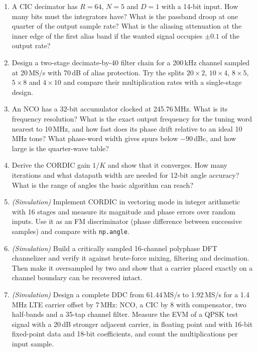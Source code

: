 \begin{enumerate}[label=\thechapter.\arabic*]
resampler by $3/2$ with a 24-tap prototype.
\item A CIC decimator has $R=64$, $N=5$ and $D=1$ with a 14-bit input. How many bits must the
integrators have? What is the passband droop at one quarter of the output sample rate? What is the
aliasing attenuation at the inner edge of the first alias band if the wanted signal occupies $\pm0.1$
of the output rate?
\item Design a two-stage decimate-by-40 filter chain for a 200\,kHz channel sampled at 20\,MS/s with
70\,dB of alias protection. Try the splits $20\times2$, $10\times4$, $8\times5$, $5\times8$ and
$4\times10$ and compare their multiplication rates with a single-stage design.
\item An NCO has a 32-bit accumulator clocked at 245.76\,MHz. What is its frequency resolution? What is
the exact output frequency for the tuning word nearest to 10\,MHz, and how fast does its phase drift
relative to an ideal 10\,MHz tone? What phase-word width gives spurs below $-90$\,dBc, and how large
is the quarter-wave table?
\item Derive the CORDIC gain $1/K$ and show that it converges. How many iterations and what datapath
width are needed for 12-bit angle accuracy? What is the range of angles the basic algorithm can
reach?
\item \emph{(Simulation)} Implement CORDIC in vectoring mode in integer arithmetic with 16 stages and
measure its magnitude and phase errors over random inputs. Use it as an FM discriminator (phase
difference between successive samples) and compare with \texttt{np.angle}.
\item \emph{(Simulation)} Build a critically sampled 16-channel polyphase DFT channelizer and verify it
against brute-force mixing, filtering and decimation. Then make it oversampled by two and show that a
carrier placed exactly on a channel boundary can be recovered intact.
\item \emph{(Simulation)} Design a complete DDC from 61.44\,MS/s to 1.92\,MS/s for a 1.4\,MHz LTE carrier
offset by 7\,MHz: NCO, a CIC by 8 with compensator, two half-bands and a 35-tap channel filter. Measure
the EVM of a QPSK test signal with a 20\,dB stronger adjacent carrier, in floating point and with 16-bit
fixed-point data and 18-bit coefficients, and count the multiplications per input sample.
\end{enumerate}

